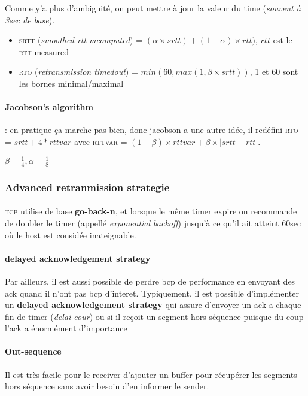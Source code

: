 Comme y'a plus d'ambiguité, on peut mettre à jour la valeur du time (\textit{souvent à 3sec
de base}).

\begin{itemize}
    \item \textsc{srtt} (\textit{smoothed rtt mcomputed}) = $ (\alpha \times srtt) + (1-\alpha) \times rtt)$, $rtt$ est le \textsc{rtt} measured
    \item \textsc{rto} (\textit{retransmission timedout}) = $min(60, max(1, \beta \times srtt))$, 1 et 60 sont les bornes minimal/maximal
\end{itemize}

\paragraph{Jacobson's algorithm} : en pratique ça marche pas bien, donc jacobson a une
autre idée, il redéfini \textsc{rto} = $srtt + 4*rttvar$ avec \textsc{rttvar} = $(1-\beta) \times rttvar + \beta \times |srtt - rtt|$.

$\beta = \frac{1}{4}, \alpha = \frac{1}{8}$

\subsubsection{Advanced retranmission strategie}

\paragraph{}
\textsc{tcp} utilise de base \textbf{go-back-n}, et lorsque le même timer
expire on recommande de doubler le timer (appellé \textit{exponential backoff}) jusqu'à
ce qu'il ait atteint 60sec où le host est considée inateignable.

\paragraph{delayed acknowledgement strategy}
Par ailleurs, il est aussi possible de perdre bcp de performance en envoyant des
ack quand il n'ont pas bcp d'interet. Typiquement, il est possible d'implémenter
un \textbf{delayed acknowledgement strategy} qui assure d'envoyer un ack a chaque fin
de timer (\textit{delai cour}) ou si il reçoit un segment hors séquence puisque du coup
l'ack a énormément d'importance

\paragraph{Out-sequence}
Il est très facile pour le receiver d'ajouter un buffer pour récupérer les
segments hors séquence sans avoir besoin d'en informer le sender.

